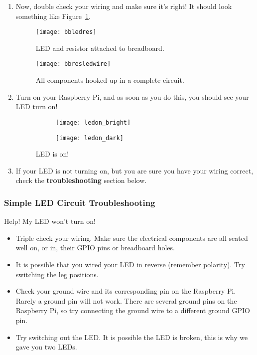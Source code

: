 \documentclass{article}\usepackage[]{graphicx}\usepackage[]{color}
\begin{document}
\begin{enumerate}
\item Now, double check your wiring and make sure it's right! It should look something like Figure~\ref{fig:bbresledwire}.


\begin{figure}
  \captionsetup{margin=10pt}
\begin{minipage}{.5\textwidth}
  \centering
  \texttt{[image: bbledres]}
  \caption{LED and resistor attached to breadboard.}
  \label{fig:bbledres}
\end{minipage}%
\begin{minipage}{.5\textwidth}
  \centering
  \texttt{[image: bbresledwire]}
  \caption{All components hooked up in a complete circuit.}
  \label{fig:bbresledwire}
\end{minipage}
\end{figure}

\item Turn on your Raspberry Pi, and as soon as you do this, you should see your LED turn on!

\begin{figure}[!h]
\centering
\begin{subfigure}{.5\textwidth}
  \centering
  \texttt{[image: ledon\_bright]}
  \label{fig:ledon_bright}
\end{subfigure}%
\begin{subfigure}{.5\textwidth}
  \centering
  \texttt{[image: ledon\_dark]}
  \label{fig:ledon_dark}
\end{subfigure}
\caption{LED is on!}
\label{fig:ledon}
\end{figure}

\item If your LED is not turning on, but you are sure you have your wiring correct, check the \textbf{troubleshooting} section below.
\end{enumerate}

\subsubsection{Simple LED Circuit Troubleshooting}
Help! My LED won't turn on!
\begin{itemize}
\item Triple check your wiring. Make sure the electrical components are all seated well on, or in, their GPIO pins or breadboard holes.
\item It is possible that you wired your LED in reverse (remember polarity). Try switching the leg positions.
\item Check your ground wire and its corresponding pin on the Raspberry Pi. Rarely a ground pin will not work. There are several ground pins on the Raspberry Pi, so try connecting the ground wire to a different ground GPIO pin.
\item Try switching out the LED. It is possible the LED is broken, this is why we gave you two LEDs.
\end{itemize}
\end{document}
